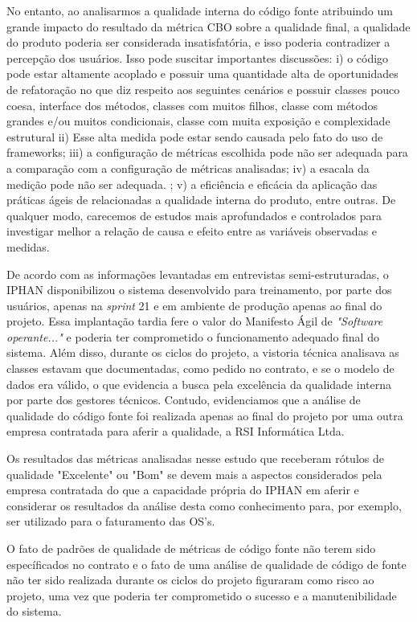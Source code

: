 No entanto, ao analisarmos a qualidade interna do código fonte atribuindo um grande impacto do resultado da métrica CBO sobre a qualidade final, a qualidade do produto poderia ser considerada insatisfatória, e isso poderia contradizer a percepção dos usuários. Isso pode suscitar importantes discussões: i) o código pode estar altamente acoplado e possuir uma quantidade alta de oportunidades de refatoração no que diz respeito aos seguintes cenários e possuir classes pouco coesa, interface dos métodos, classes com muitos filhos, classe com métodos grandes e/ou muitos condicionais, classe com muita exposição e complexidade estrutural ii) Esse alta medida pode estar sendo causada pelo fato do uso de frameworks; iii) a configuração de métricas escolhida pode não ser adequada para a comparação com a configuração de métricas analisadas; iv) a esacala da medição pode não ser adequada. ; v) a eficiência e eficácia da aplicação das práticas ágeis de relacionadas a qualidade interna do produto, entre outras. De qualquer modo, carecemos de estudos mais aprofundados e controlados para investigar melhor a relação de causa e efeito entre as variáveis observadas e medidas.

De acordo com as informações levantadas em entrevistas semi-estruturadas, o IPHAN disponibilizou o sistema desenvolvido para treinamento, por parte dos usuários, apenas na \textit{sprint} 21 e em ambiente de produção apenas ao final do projeto. Essa implantação tardia fere o valor do Manifesto Ágil de \textit{"Software operante..."} e poderia ter comprometido o funcionamento adequado final do sistema. Além disso, durante os ciclos do projeto, a vistoria técnica analisava as classes estavam que documentadas, como pedido no contrato, e se o modelo de dados era válido, o que evidencia a busca pela excelência da qualidade interna por parte dos gestores técnicos. Contudo, evidenciamos que a análise de qualidade do código fonte foi realizada apenas ao final do projeto por uma outra empresa contratada para aferir a qualidade, a RSI Informática Ltda. 


Os resultados das métricas analisadas nesse estudo que receberam rótulos de qualidade "Excelente" ou "Bom" se devem mais a aspectos considerados pela empresa contratada do que a capacidade própria do IPHAN em aferir e considerar os resultados da análise desta como conhecimento para, por exemplo, ser utilizado para o faturamento das OS's.

O fato de padrões de qualidade de métricas de código fonte não terem sido específicados no contrato e o fato de uma análise de qualidade de código de fonte não ter sido realizada durante os ciclos do projeto figuraram como risco ao projeto, uma vez que poderia ter comprometido o sucesso e a manutenibilidade do sistema.
